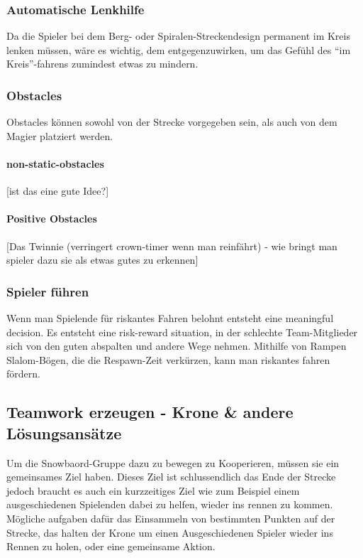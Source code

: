 \subsubsection{Automatische Lenkhilfe}
Da die Spieler bei dem Berg- oder Spiralen-Streckendesign permanent im Kreis lenken müssen, wäre es wichtig, dem entgegenzuwirken, um das Gefühl des "`im Kreis"'-fahrens zumindest etwas zu mindern.

\subsubsection{Obstacles}
Obstacles können sowohl von der Strecke vorgegeben sein, als auch von dem Magier platziert werden.

\paragraph{non-static-obstacles}
[ist das eine gute Idee?]

\paragraph{Positive Obstacles}
[Das Twinnie (verringert crown-timer wenn man reinfährt) - wie bringt man spieler dazu sie als etwas gutes zu erkennen]

\subsubsection{Spieler führen}
Wenn man Spielende für riskantes Fahren belohnt entsteht eine meaningful decision. Es entsteht eine risk-reward situation, in der schlechte Team-Mitglieder sich von den guten abspalten und andere Wege nehmen. Mithilfe von Rampen Slalom-Bögen, die die Respawn-Zeit verkürzen, kann man riskantes fahren fördern.

\subsection{Teamwork erzeugen - Krone \& andere Lösungsansätze\label{_teamwork_erzeugen}}
Um die Snowbaord-Gruppe dazu zu bewegen zu Kooperieren, müssen sie ein gemeinsames Ziel haben. Dieses Ziel ist schlussendlich das Ende der Strecke jedoch braucht es auch ein kurzzeitiges Ziel wie zum Beispiel einem ausgeschiedenen Spielenden dabei zu helfen, wieder ins rennen zu kommen. Mögliche aufgaben dafür das Einsammeln von bestimmten Punkten auf der Strecke, das halten der Krone um einen Ausgeschiedenen Spieler wieder ins Rennen zu holen, oder eine gemeinsame Aktion.

